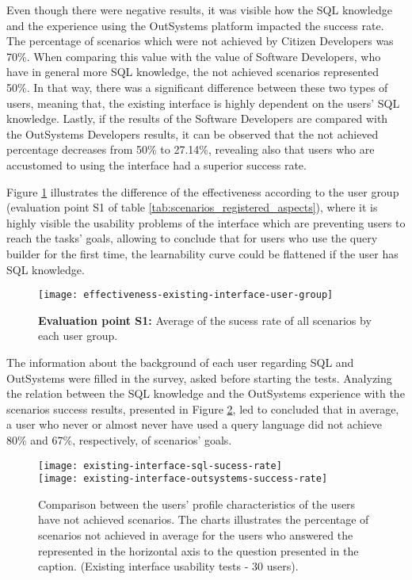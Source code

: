 Even though there were negative results, it was visible how the SQL knowledge and the experience using the OutSystems platform impacted the success rate. The percentage of scenarios which were not achieved by Citizen Developers was 70\%. When comparing this value with the value of Software Developers, who have in general more SQL knowledge, the not achieved scenarios represented 50\%. In that way, there was a significant difference between these two types of users, meaning that, the existing interface is highly dependent on the users' SQL knowledge. Lastly, if the results of the Software Developers are compared with the OutSystems Developers results, it can be observed that the not achieved percentage decreases from 50\% to 27.14\%, revealing also that users who are accustomed to using the interface had a superior success rate.

Figure \ref{fig:effectivenessExistingInterfaceUserGroup} illustrates the difference of the effectiveness according to the user group (evaluation point S1 of table \ref{tab:scenarios_registered_aspects}), where it is highly visible the usability problems of the interface which are preventing users to reach the tasks' goals, allowing to conclude that for users who use the query builder for the first time, the learnability curve could be flattened if the user has SQL knowledge.


\begin{figure}[htbp]
	\centering
	\texttt{[image: effectiveness-existing-interface-user-group]}
	\caption{\textbf{Evaluation point S1:} Average of the sucess rate of all scenarios by each user group.}
	\label{fig:effectivenessExistingInterfaceUserGroup}
\end{figure}

The information about the background of each user regarding SQL and OutSystems were filled in the survey, asked before starting the tests. Analyzing the relation between the SQL knowledge and the OutSystems experience with the scenarios success results, presented in Figure \ref{fig:existingInterfaceSqlOutsystemsSuccessRate}, led to concluded that in average, a user who never or almost never have used a query language did not achieve 80\% and 67\%, respectively, of scenarios' goals.

\begin{figure}[htbp]
    \centering
      {\texttt{[image: existing-interface-sql-sucess-rate]}}%
      \\
      {\texttt{[image: existing-interface-outsystems-success-rate]}}%
    \caption{Comparison between the users' profile characteristics of the users have not achieved scenarios. The charts illustrates the percentage of scenarios not achieved in average for the users who answered the represented in the horizontal axis to the question presented in the caption. (Existing interface usability tests - 30 users). 
      }
    \label{fig:existingInterfaceSqlOutsystemsSuccessRate}
  \end{figure}

